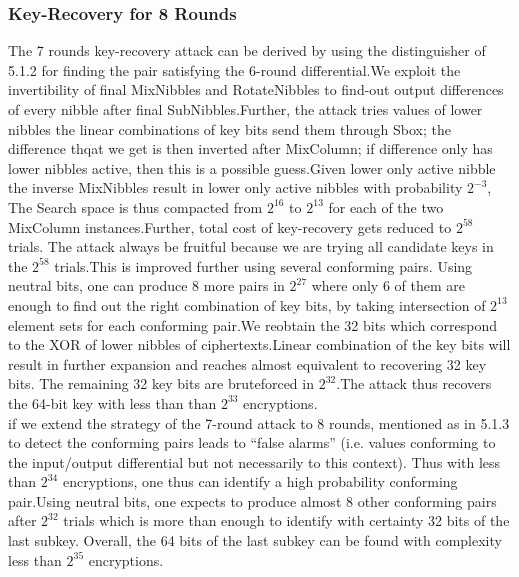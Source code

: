 \documentclass[preprint]{transcrypto}
\begin{document}
\subsubsection{Key-Recovery for 8 Rounds}
The 7 rounds key-recovery attack can be derived by using the distinguisher of 5.1.2 for
finding the pair satisfying the 6-round differential.We exploit the invertibility of final MixNibbles and RotateNibbles to find-out output differences of every nibble after final SubNibbles.Further, the attack tries values of lower nibbles the linear combinations of key bits send them through Sbox; the difference thqat we get is then inverted after MixColumn; if difference only has lower nibbles active, then this is a possible guess.Given lower only active nibble the inverse MixNibbles result in lower only active nibbles with probability $2^{−3}$, The Search space is thus compacted from $2^{16}$
to $2^{13}$ for each of the two MixColumn instances.Further, total cost of key-recovery gets reduced to $2^{58}$ trials. The attack always be fruitful because we are trying all candidate keys in the $2^{58}$ trials.This is improved further using several conforming pairs. Using neutral
bits, one can produce 8 more pairs in $2^27$ where only 6 of them are enough to
find out the right combination of key bits, by taking intersection of $2^{13}$ element sets for each conforming pair.We reobtain the 32 bits which correspond to the XOR of lower nibbles of ciphertexts.Linear combination of the key bits will result in further expansion and reaches almost equivalent to recovering 32 key bits. The remaining 32 key bits are bruteforced in $2^32$.The attack thus recovers the 64-bit key with less than than $2^{33}$ encryptions.\\

if we extend the strategy of the 7-round attack to 8 rounds, mentioned as in 5.1.3 to detect the conforming pairs leads to “false alarms” (i.e. values conforming to the input/output differential
but not necessarily to this context). Thus with less than $2^{34}$ encryptions, one thus can identify a high probability conforming pair.Using neutral bits, one expects to produce almost 8 other conforming pairs after $2^{32}$ trials which is more than enough to identify with certainty 32 bits
of the last subkey. Overall, the 64 bits of the last subkey can be found with complexity less than
$2^{35}$ encryptions.\\
\end{document}
